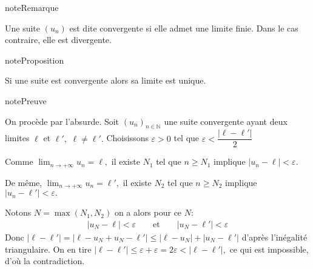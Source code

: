 \documentclass[letterpaper,10pt,french]{jupyterBook}
\begin{document}
\begin{sphinxadmonition}{note}{Remarque}

\sphinxAtStartPar
Une suite \((u_n)\) est dite convergente si elle admet une limite finie. Dans le cas contraire, elle est divergente.
\end{sphinxadmonition}

\begin{sphinxadmonition}{note}{Proposition}

\sphinxAtStartPar
Si une suite est convergente alors sa limite est unique.
\end{sphinxadmonition}

\begin{sphinxadmonition}{note}{Preuve}

\sphinxAtStartPar
On procède par l’absurde. Soit \((u_n)_{n\in \mathbb{N}}\) une suite convergente ayant deux limites \(\ell\) et \(\ell',\) \(\ell\neq \ell'.\)  Choisissons \(\varepsilon>0\) tel que \(\varepsilon<\dfrac{|\ell-\ell'|}{2}\)

\sphinxAtStartPar
Comme \(\lim_{n \rightarrow +\infty}u_n=\ell,\) il existe \(N_1\) tel que \(n\geq N_1\) implique \(|u_n-\ell|<\varepsilon.\)

\sphinxAtStartPar
De même, \(\lim_{n \rightarrow +\infty}u_n=\ell',\) il existe \(N_2\) tel que \(n\geq N_2\) implique \(|u_n-\ell'|<\varepsilon.\)

\sphinxAtStartPar
Notons \(N=\max(N_1, N_2)\) on a alors pour ce \(N :\)
\begin{equation*}
\begin{split}
|u_N-\ell|<\varepsilon\qquad\mbox{et}\qquad|u_N-\ell'|<\varepsilon
\end{split}
\end{equation*}
\sphinxAtStartPar
Donc \(|\ell-\ell'|=|\ell-u_N+u_N-\ell'|\leqslant |\ell-u_N|+|u_N-\ell'|\)  d’après l’inégalité triangulaire. On en tire \(|\ell-\ell'|\leqslant\varepsilon+\varepsilon=2\varepsilon<|\ell-\ell'|,\) ce qui est impossible, d’où la contradiction.
\end{sphinxadmonition}
\end{document}
